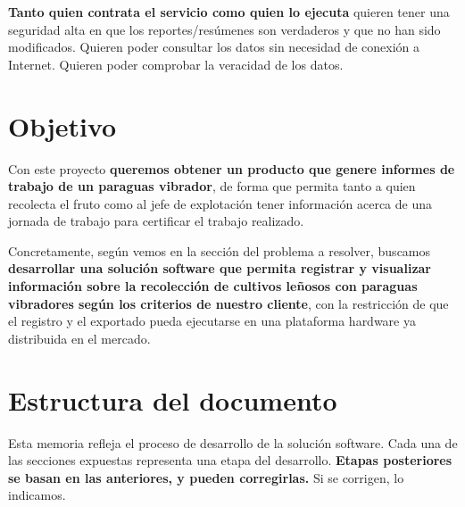 \textbf{Tanto quien contrata el servicio como quien lo ejecuta} quieren tener una seguridad alta
en que los reportes/resúmenes son verdaderos y que no han sido modificados. Quieren poder consultar
los datos sin necesidad de conexión a Internet. Quieren poder comprobar la veracidad de los datos.

\section{Objetivo}

Con este proyecto \textbf{queremos obtener un producto que genere informes
de trabajo de un paraguas vibrador}, de forma que permita tanto a
quien recolecta el fruto como al jefe de explotación tener información
acerca de una jornada de trabajo para certificar el trabajo realizado.

Concretamente, según vemos en la sección del problema a resolver,
buscamos \textbf{desarrollar
una solución software que permita registrar y visualizar
información sobre la recolección de cultivos
leñosos con paraguas vibradores según los criterios de nuestro cliente},
con la restricción de que el registro y el exportado pueda ejecutarse en
una plataforma hardware ya distribuida en el mercado.

\section{Estructura del documento}

Esta memoria refleja el proceso de desarrollo de la solución software.
Cada una de las secciones expuestas representa una etapa del desarrollo.
\textbf{Etapas posteriores se basan en las anteriores, y pueden corregirlas.}
Si se corrigen, lo indicamos.

